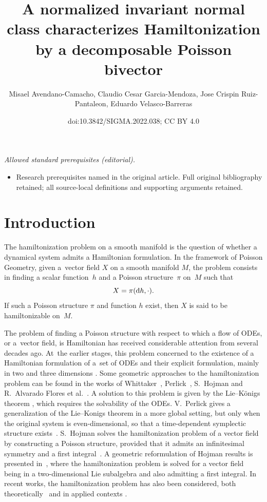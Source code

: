 \documentclass[10pt,a4paper]{amsart}
\title{A normalized invariant normal class characterizes Hamiltonization by a decomposable Poisson bivector}
\author{Misael Avendano-Camacho, Claudio Cesar Garcia-Mendoza, Jose Crispin Ruiz-Pantaleon, Eduardo Velasco-Barreras}
\date{doi:10.3842/SIGMA.2022.038; CC BY 4.0}
\newcommand{\dd}{{\rm d}}
\numberwithin{equation}{section}
\begin{document}
\maketitle
\noindent\textit{Allowed standard prerequisites (editorial).}\begin{itemize}
\item Research prerequisites named in the original article. Full original bibliography retained; all source-local definitions and supporting arguments retained.
\end{itemize}\medskip
\section{Introduction}%

The hamiltonization problem on a smooth manifold is the question of whether a dynamical system admits a Hamiltonian formulation. In the framework of Poisson Geometry, given a~vector field $X$ on a smooth manifold $M$, the problem consists in finding a scalar function~$h$ and a Poisson structure~$\pi$ on~$M$ such that
 \begin{equation}\label{EcIntroHam}
 X = \pi(\dd h, \cdot ).
 \end{equation}
If such a Poisson structure $\pi$ and function $h$ exist, then $X$ is said to be hamiltonizable on~$M$.

The problem of finding a Poisson structure with respect to which a flow of ODEs, or a~vec\-tor field, is Hamiltonian has received considerable attention from several decades ago. At~the earlier stages, this problem concerned to the existence of a Hamiltonian formulation of a~set of ODEs and their explicit formulation, mainly in two and three dimensions \cite{Abar-87,CairoFeix-92,Gumral-Nut,Hern-97,Whittaker}. Some geometric approaches to the hamiltonization problem can be found in the works of Whittaker~\cite{Whittaker}, Perlick~\cite{Perlick-92}, S.~Hojman \cite{Hoj-91,Hojman-96} and R.~Alvarado Flores et al.~\cite{AHA-06}. A solution to this problem is given by the Lie--K\"{o}nigs theorem \cite{Whittaker}, which requires the solvability of the ODEs. V.~Perlick gives a generalization of the Lie--Konigs theorem in a more global setting, but only when the original system is even-dimensional, so that a time-dependent symplectic structure exists~\cite{Perlick-92}. S.~Hojman solves the hamiltonization problem of a vector field by constructing a Poisson structure, provided that it admits an infinitesimal symmetry and a first integral~\cite{Hojman-96}. A geometric reformulation of Hojman results is presented in~\cite{AHA-06}, where the hamiltonization problem is solved for a vector field being in a two-dimensional Lie subalgebra and also admitting a first integral. In recent works, the hamiltonization problem has also been considered, both theoretically~\cite{Kozlov-2020} and in applied contexts \cite{Ballesteros_2020}.
\end{document}
